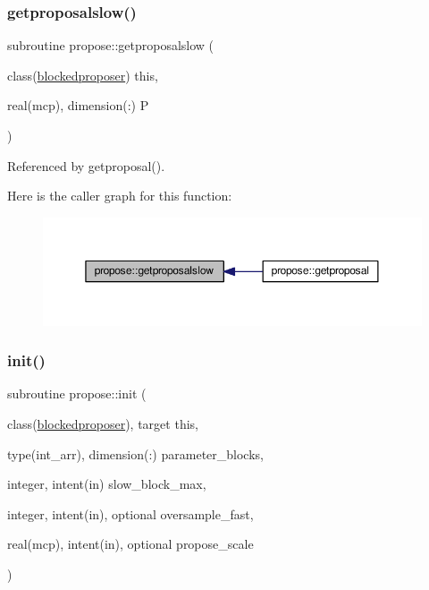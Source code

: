 \subsubsection{\texorpdfstring{getproposalslow()}{getproposalslow()}}
{\footnotesize\ttfamily subroutine propose\+::getproposalslow (\begin{DoxyParamCaption}\item[{class(\mbox{\hyperlink{structpropose_1_1blockedproposer}{blockedproposer}})}]{this,  }\item[{real(mcp), dimension(\+:)}]{P }\end{DoxyParamCaption})}



Referenced by getproposal().

Here is the caller graph for this function\+:
\nopagebreak
\begin{figure}[H]
\begin{center}
\leavevmode
\includegraphics[width=350pt]{namespacepropose_a593b61b41784923a7b85bc8a66c07ef8_icgraph}
\end{center}
\end{figure}
\mbox{\label{namespacepropose_a4a4f0ef5bf70846bd7b2274da1f889cb}} 
\subsubsection{\texorpdfstring{init()}{init()}}
{\footnotesize\ttfamily subroutine propose\+::init (\begin{DoxyParamCaption}\item[{class(\mbox{\hyperlink{structpropose_1_1blockedproposer}{blockedproposer}}), target}]{this,  }\item[{type(int\+\_\+arr), dimension(\+:)}]{parameter\+\_\+blocks,  }\item[{integer, intent(in)}]{slow\+\_\+block\+\_\+max,  }\item[{integer, intent(in), optional}]{oversample\+\_\+fast,  }\item[{real(mcp), intent(in), optional}]{propose\+\_\+scale }\end{DoxyParamCaption})}




